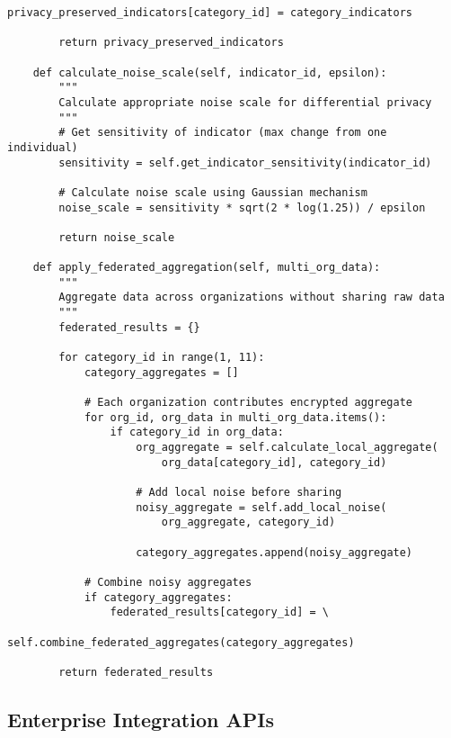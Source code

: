 \documentclass[10pt,twocolumn]{IEEEtran}
\begin{document}
\begin{lstlisting}[caption={Privacy-Preserving Data Collection Architecture}]
            privacy_preserved_indicators[category_id] = category_indicators
        
        return privacy_preserved_indicators
    
    def calculate_noise_scale(self, indicator_id, epsilon):
        """
        Calculate appropriate noise scale for differential privacy
        """
        # Get sensitivity of indicator (max change from one individual)
        sensitivity = self.get_indicator_sensitivity(indicator_id)
        
        # Calculate noise scale using Gaussian mechanism
        noise_scale = sensitivity * sqrt(2 * log(1.25)) / epsilon
        
        return noise_scale
    
    def apply_federated_aggregation(self, multi_org_data):
        """
        Aggregate data across organizations without sharing raw data
        """
        federated_results = {}
        
        for category_id in range(1, 11):
            category_aggregates = []
            
            # Each organization contributes encrypted aggregate
            for org_id, org_data in multi_org_data.items():
                if category_id in org_data:
                    org_aggregate = self.calculate_local_aggregate(
                        org_data[category_id], category_id)
                    
                    # Add local noise before sharing
                    noisy_aggregate = self.add_local_noise(
                        org_aggregate, category_id)
                    
                    category_aggregates.append(noisy_aggregate)
            
            # Combine noisy aggregates
            if category_aggregates:
                federated_results[category_id] = \
                    self.combine_federated_aggregates(category_aggregates)
        
        return federated_results
\end{lstlisting}

\subsection{Enterprise Integration APIs}
\end{document}

